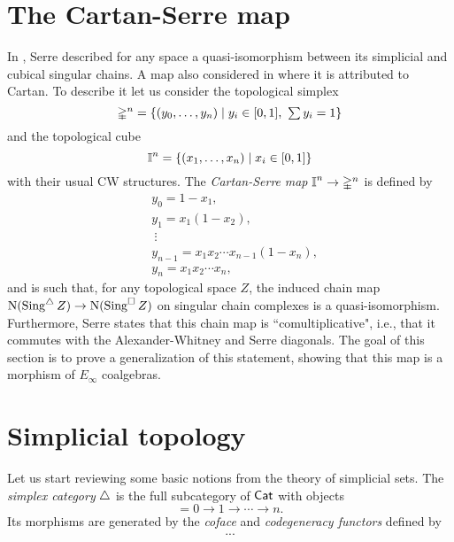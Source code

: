 
\section{The Cartan-Serre map}

In \cite[p. 442]{Serre1951homologie}, Serre described for any space a quasi-isomorphism between its simplicial and cubical singular chains.
A map also considered in \cite[p.199]{Eilenberg1953acyclic} where it is attributed to Cartan.
To describe it let us consider the topological simplex
\begin{equation*}
\mathbb{\Delta}^n = \{(y_0, \dots, y_n) \mid y_i \in [0,1], \ \textstyle{\sum} \, y_i = 1\}
\end{equation*}
and the topological cube
\begin{equation*}
\bm{\mathbb{I}}^{n} = \{(x_1, \dots, x_n) \mid x_i \in [0,1]\}
\end{equation*}
with their usual CW structures.
The \textit{Cartan-Serre} \textit{map} $\bm{\mathbb{I}}^n \to \mathbb{\Delta}^n$ is defined by
\begin{equation} \label{e:cartan-serre CW map}
\begin{split}
&y_0 = 1 - x_1, \\
&y_1 = x_1(1 - x_2), \\
&\ \vdots \\
&y_{n-1} = x_1 x_2 \cdots x_{n-1}(1-x_n), \\
&y_{n} = x_1 x_2 \cdots x_n,
\end{split}
\end{equation}
and is such that, for any topological space $Z$, the induced chain map $\operatorname{N}(\operatorname{Sing}^{\triangle} Z) \to \operatorname{N}(\operatorname{Sing}^{\square} Z)$ on singular chain complexes is a quasi-isomorphism.
Furthermore, Serre states that this chain map is ``comultiplicative", i.e., that it commutes with the Alexander-Whitney and Serre diagonals.
The goal of this section is to prove a generalization of this statement, showing that this map is a morphism of $E_\infty$ coalgebras.

\section{Simplicial topology}

Let us start reviewing some basic notions from the theory of simplicial sets.
The \textit{simplex category} $\triangle$ is the full subcategory of $\mathsf{Cat}$ with objects
\begin{equation*}
[n] = 0 \to 1 \to \cdots \to n.
\end{equation*}
Its morphisms are generated by the \textit{coface} and \textit{codegeneracy functors} defined by
\begin{align*}
...
\end{align*}

